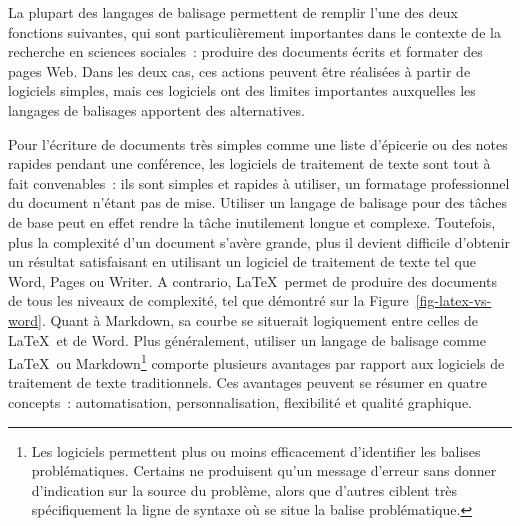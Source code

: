 \documentclass[
  letterpaper,
]{scrbook}
\begin{document}
La plupart des langages de balisage permettent de remplir l'une des deux
fonctions suivantes, qui sont particulièrement importantes dans le
contexte de la recherche en sciences sociales~: produire des documents
écrits et formater des pages Web. Dans les deux cas, ces actions peuvent
être réalisées à partir de logiciels simples, mais ces logiciels ont des
limites importantes auxquelles les langages de balisages apportent des
alternatives.

Pour l'écriture de documents très simples comme une liste d'épicerie ou
des notes rapides pendant une conférence, les logiciels de traitement de
texte sont tout à fait convenables~: ils sont simples et rapides à
utiliser, un formatage professionnel du document n'étant pas de mise.
Utiliser un langage de balisage pour des tâches de base peut en effet
rendre la tâche inutilement longue et complexe. Toutefois, plus la
complexité d'un document s'avère grande, plus il devient difficile
d'obtenir un résultat satisfaisant en utilisant un logiciel de
traitement de texte tel que Word, Pages ou Writer. A contrario,
\LaTeX~permet de produire des documents de tous les niveaux de
complexité, tel que démontré sur la Figure~\ref{fig-latex-vs-word}.
Quant à Markdown, sa courbe se situerait logiquement entre celles de
\LaTeX~et de Word. Plus généralement, utiliser un langage de balisage
comme \LaTeX~ou Markdown\footnote{Les logiciels permettent plus ou moins
  efficacement d'identifier les balises problématiques. Certains ne
  produisent qu'un message d'erreur sans donner d'indication sur la
  source du problème, alors que d'autres ciblent très spécifiquement la
  ligne de syntaxe où se situe la balise problématique.} comporte
plusieurs avantages par rapport aux logiciels de traitement de texte
traditionnels. Ces avantages peuvent se résumer en quatre concepts~:
automatisation, personnalisation, flexibilité et qualité graphique.
\end{document}
